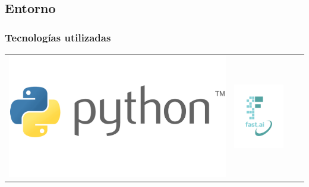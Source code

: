 \subsection{Entorno}
\begin{frame}
  \frametitle{Tecnologías utilizadas}
  \begin{table}[htp]
    \vspace{-.5cm}
      \begin{tabular}{cccc}
        \begin{minipage}{.2\textwidth}
          \includegraphics[width=\textwidth]{imagenes/chapter3/Python}
        \end{minipage} 
                                  & 
        \begin{minipage}{.2\textwidth}
          \includegraphics[width=.9\textwidth]{imagenes/chapter3/FastAI}

\end{minipage}
\end{tabular}
\end{table}
\end{frame}
